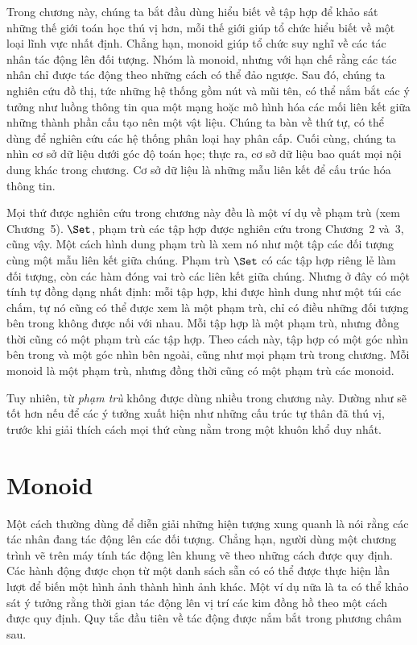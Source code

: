 Trong chương này, chúng ta bắt đầu dùng hiểu biết về tập hợp để khảo sát những thế giới toán học thú vị hơn, mỗi thế giới giúp tổ chức hiểu biết về một loại lĩnh vực nhất định. Chẳng hạn, monoid giúp tổ chức suy nghĩ về các tác nhân tác động lên đối tượng. Nhóm là monoid, nhưng với hạn chế rằng các tác nhân chỉ được tác động theo những cách có thể đảo ngược. Sau đó, chúng ta nghiên cứu đồ thị, tức những hệ thống gồm nút và mũi tên, có thể nắm bắt các ý tưởng như luồng thông tin qua một mạng hoặc mô hình hóa các mối liên kết giữa những thành phần cấu tạo nên một vật liệu. Chúng ta bàn về thứ tự, có thể dùng để nghiên cứu các hệ thống phân loại hay phân cấp. Cuối cùng, chúng ta nhìn cơ sở dữ liệu dưới góc độ toán học; thực ra, cơ sở dữ liệu bao quát mọi nội dung khác trong chương. Cơ sở dữ liệu là những mẫu liên kết để cấu trúc hóa thông tin.

Mọi thứ được nghiên cứu trong chương này đều là một ví dụ về phạm trù (xem Chương~5). $\Set$, phạm trù các tập hợp được nghiên cứu trong Chương~2 và~3, cũng vậy. Một cách hình dung phạm trù là xem nó như một tập các đối tượng cùng một mẫu liên kết giữa chúng. Phạm trù $\Set$ có các tập hợp riêng lẻ làm đối tượng, còn các hàm đóng vai trò các liên kết giữa chúng. Nhưng ở đây có một tính tự đồng dạng nhất định: mỗi tập hợp, khi được hình dung như một túi các chấm, tự nó cũng có thể được xem là một phạm trù, chỉ có điều những đối tượng bên trong không được nối với nhau. Mỗi tập hợp là một phạm trù, nhưng đồng thời cũng có một phạm trù các tập hợp. Theo cách này, tập hợp có một góc nhìn bên trong và một góc nhìn bên ngoài, cũng như mọi phạm trù trong chương. Mỗi monoid là một phạm trù, nhưng đồng thời cũng có một phạm trù các monoid.

Tuy nhiên, từ \emph{phạm trù} không được dùng nhiều trong chương này. Dường như sẽ tốt hơn nếu để các ý tưởng xuất hiện như những cấu trúc tự thân đã thú vị, trước khi giải thích cách mọi thứ cùng nằm trong một khuôn khổ duy nhất.

\section{Monoid}

Một cách thường dùng để diễn giải những hiện tượng xung quanh là nói rằng các tác nhân đang tác động lên các đối tượng. Chẳng hạn, người dùng một chương trình vẽ trên máy tính tác động lên khung vẽ theo những cách được quy định. Các hành động được chọn từ một danh sách sẵn có có thể được thực hiện lần lượt để biến một hình ảnh thành hình ảnh khác. Một ví dụ nữa là ta có thể khảo sát ý tưởng rằng thời gian tác động lên vị trí các kim đồng hồ theo một cách được quy định. Quy tắc đầu tiên về tác động được nắm bắt trong phương châm sau.

